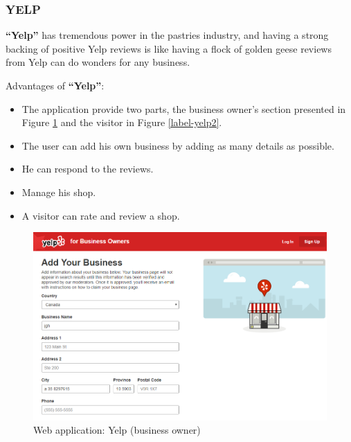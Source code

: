 \documentclass[12pt,a4paper]{report}
\begin{document}
	\subsubsection*{YELP}
	\textbf{``Yelp''} has tremendous power in the pastries industry, and having a strong backing of positive Yelp reviews is like having a flock of golden geese reviews from Yelp can do wonders for any business.\par 
	Advantages of \textbf{``Yelp''}:
	\begin{itemize}
		\item The application provide two parts, the business owner's section presented in Figure \ref{label-yelp1} and the visitor in Figure \ref{label-yelp2}.
		\item  The user can add his own business by adding as many details as possible.
		\item He can respond to the reviews.
		\item Manage his shop.
		\item A visitor can rate and review a shop.
		
	\end{itemize}
	\begin{figure}[H]
		\centering
		\includegraphics[width=5in,keepaspectratio]{yelp.png}
		\caption{Web application: Yelp (business owner)\protect{}\protect\footnotemark[\thefootnote]}
		
		
		\label{label-yelp1}
	\end{figure}
\end{document}

